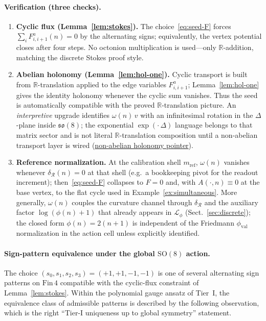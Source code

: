 \documentclass[11pt]{amsart}
\begin{document}
\paragraph{Verification (three checks).}
\begin{enumerate}
\item \textbf{Cyclic flux (Lemma~\ref{lem:stokes}).} The choice~\eqref{eq:seed-F} forces \(\sum_i F^a_{i,i+1}(n)=0\) by the alternating signs; equivalently, the vertex potential closes after four steps. No octonion multiplication is used---only \(\mathbb{R}\)-addition, matching the discrete Stokes proof style.
\item \textbf{Abelian holonomy (Lemma~\ref{lem:hol-one}).} Cyclic transport is built from \(\mathbb{R}\)-translation applied to the edge variables \(F^a_{i,i+1}\); Lemma~\ref{lem:hol-one} gives the identity holonomy whenever the cyclic sum vanishes. Thus the seed is automatically compatible with the proved \(\mathbb{R}\)-translation picture. An \emph{interpretive} upgrade identifies \(\omega(n)\,v\) with an infinitesimal rotation in the \(\Delta\)-plane inside \(\mathfrak{so}(8)\); the exponential \(\exp(\cdot\,\Delta)\) language belongs to that matrix sector and is not literal \(\mathbb{R}\)-translation composition until a non-abelian transport layer is wired (\hyperref[lean:non-abelian-pointer]{non-abelian holonomy pointer}).
\item \textbf{Reference normalization.} At the calibration shell \(m_{\mathrm{ref}}\), \(\omega(n)\) vanishes whenever \(\delta_{\mathcal{R}}(n)=0\) at that shell (e.g.\ a bookkeeping pivot for the readout increment); then~\eqref{eq:seed-F} collapses to \(F=0\) and, with \(A(\cdot,n)\equiv 0\) at the base vertex, to the flat cycle used in Example~\ref{ex:simultaneous}. More generally, \(\omega(n)\) couples the curvature channel through \(\delta_{\mathcal{R}}\) and the auxiliary factor \(\log(\phi(n)+1)\) that already appears in \(\mathcal{L}_\phi\) (Sect.~\ref{sec:discrete}); the closed form \(\phi(n)=2(n+1)\) is independent of the Friedmann \(\phi_{\mathrm{val}}\) normalization in the action cell unless explicitly identified.
\end{enumerate}

\paragraph{Sign-pattern equivalence under the global \(\mathrm{SO}(8)\) action.}
The choice \((s_0,s_1,s_2,s_3)=(+1,+1,-1,-1)\) is one of several alternating sign patterns on \(\mathrm{Fin}\,4\) compatible with the cyclic-flux constraint of Lemma~\ref{lem:stokes}. Within the polynomial gauge ansatz of Tier~I, the equivalence class of admissible patterns is described by the following observation, which is the right ``Tier-I uniqueness up to global symmetry'' statement.
\end{document}

